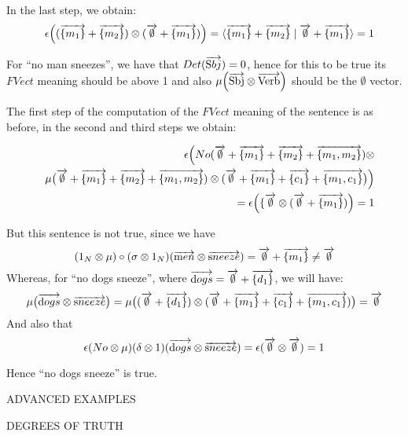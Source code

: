 \noindent
In the last step, we obtain:
\begin{eqnarray*}
&& \epsilon \Big((\overrightarrow{\{m_1\}} + \overrightarrow{\{m_2\}}) \otimes (\overrightarrow{\emptyset }+ \overrightarrow{\{m_1\}})\Big) = \langle \overrightarrow{\{m_1\}} + \overrightarrow{\{m_2\}}  \mid \overrightarrow{\emptyset} + \overrightarrow{\{m_1\}} \rangle =  1
\end{eqnarray*}


\noindent
For ``no man sneezes'', we have that $Det(\overrightarrow{\text Sbj}) = 0$, hence for this to be true its $FVect$ meaning should be above 1 and also $\mu \Big(\overrightarrow{\text{Sbj}} \otimes \overrightarrow{\text{Verb}} \Big)$ should be the $\emptyset$ vector. 

The first step of the computation  of the $FVect$ meaning of the sentence is as before, in the second and third steps we obtain:

\begin{eqnarray*}
&&\epsilon \Big (No (\overrightarrow{\emptyset} + \overrightarrow{\{m_1\}} + \overrightarrow{\{m_2\}} + \overrightarrow{\{m_1, m_2\}}) \otimes \\
&& \mu\big(\overrightarrow{\emptyset}  + \overrightarrow{\{m_1\}} + \overrightarrow{\{m_2\}}  + \overrightarrow{\{m_1, m_2\}}) \otimes (\overrightarrow{\emptyset} + \overrightarrow{\{m_1\}} + \overrightarrow{\{c_1\}} + \overrightarrow{\{m_1, c_1\}}\big)\Big)\\
&&= 
\epsilon \Big(\{\overrightarrow{\emptyset} \otimes (\overrightarrow{\emptyset} + \overrightarrow{\{m_1\}}) \Big) = 1
\end{eqnarray*}

\noindent
But this sentence is not true, since we have 
\[
(1_N \otimes \mu) \circ (\sigma \otimes 1_N)(\overrightarrow{\text men} \otimes \overrightarrow{\text sneeze})   = 
\overrightarrow{\emptyset} + \overrightarrow{\{m_1\}} \neq \overrightarrow{\emptyset}
\]
Whereas, for  ``no dogs sneeze'', where $\overrightarrow{\text dogs} = \overrightarrow{\emptyset} + \overrightarrow{\{d_1\}}$, we will have:
\[
\mu\big(\overrightarrow{\text dogs} \otimes \overrightarrow{\text sneeze}\big) = \mu \big((\overrightarrow{\emptyset} + \overrightarrow{\{d_1\}}) \otimes (\overrightarrow{\emptyset} + \overrightarrow{\{m_1\}} + \overrightarrow{\{c_1\}} + \overrightarrow{\{m_1, c_1\}})\big) = \overrightarrow{\emptyset}
\]
And also that 
\[\epsilon(No \otimes \mu) (\delta \otimes 1)(\overrightarrow{\text dogs} \otimes \overrightarrow{\text sneeze}) =
\epsilon(\overrightarrow{\emptyset} \otimes \overrightarrow{\emptyset}) = 1
\]

\noindent
Hence ``no dogs sneeze'' is true.

ADVANCED EXAMPLES

DEGREES OF TRUTH 

